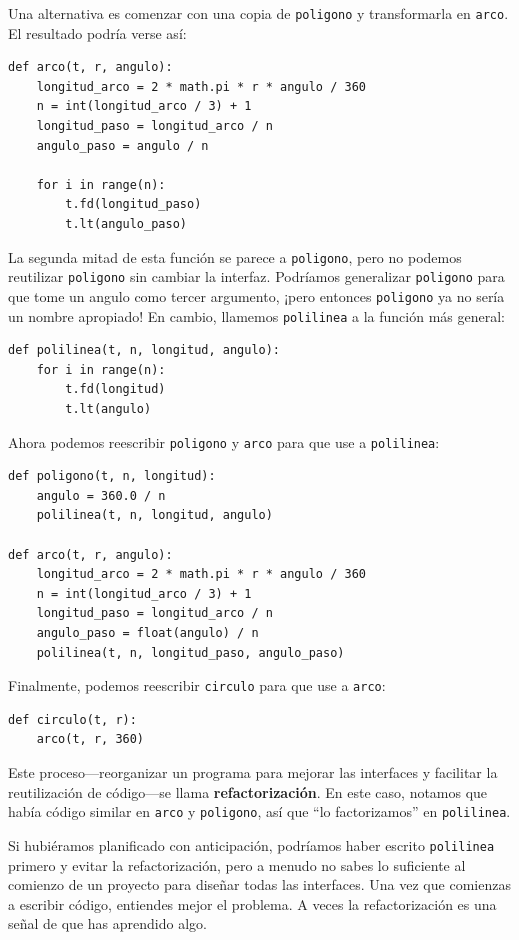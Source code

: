 \documentclass[10pt]{book}
\begin{document}
Una alternativa es comenzar con una copia
de {\tt poligono} y transformarla en {\tt arco}.  El resultado
podría verse así:

\begin{verbatim}
def arco(t, r, angulo):
    longitud_arco = 2 * math.pi * r * angulo / 360
    n = int(longitud_arco / 3) + 1
    longitud_paso = longitud_arco / n
    angulo_paso = angulo / n

    for i in range(n):
        t.fd(longitud_paso)
        t.lt(angulo_paso)
\end{verbatim}
%
La segunda mitad de esta función se parece a {\tt poligono}, pero
no podemos reutilizar {\tt poligono} sin cambiar la interfaz.  Podríamos
generalizar {\tt poligono} para que tome un angulo como tercer argumento,
¡pero entonces {\tt poligono} ya no sería un nombre apropiado!
En cambio, llamemos {\tt polilinea} a la función más general: 

\begin{verbatim}
def polilinea(t, n, longitud, angulo):
    for i in range(n):
        t.fd(longitud)
        t.lt(angulo)
\end{verbatim}
%
Ahora podemos reescribir {\tt poligono} y {\tt arco} para que use a {\tt polilinea}:

\begin{verbatim}
def poligono(t, n, longitud):
    angulo = 360.0 / n
    polilinea(t, n, longitud, angulo)

def arco(t, r, angulo):
    longitud_arco = 2 * math.pi * r * angulo / 360
    n = int(longitud_arco / 3) + 1
    longitud_paso = longitud_arco / n
    angulo_paso = float(angulo) / n
    polilinea(t, n, longitud_paso, angulo_paso)
\end{verbatim}
%
Finalmente, podemos reescribir {\tt circulo} para que use a {\tt arco}:

\begin{verbatim}
def circulo(t, r):
    arco(t, r, 360)
\end{verbatim}
%
Este proceso---reorganizar un programa para mejorar
las interfaces y facilitar la reutilización de código---se llama {\bf refactorización}.
En este caso, notamos que había código similar en {\tt arco} y
{\tt poligono}, así que ``lo factorizamos'' en {\tt polilinea}.

Si hubiéramos planificado con anticipación, podríamos haber escrito {\tt polilinea} primero
y evitar la refactorización, pero a menudo no sabes lo suficiente al
comienzo de un proyecto para diseñar todas las interfaces.  Una vez que comienzas
a escribir código, entiendes mejor el problema.  A veces la refactorización es una
señal de que has aprendido algo.
\end{document}
